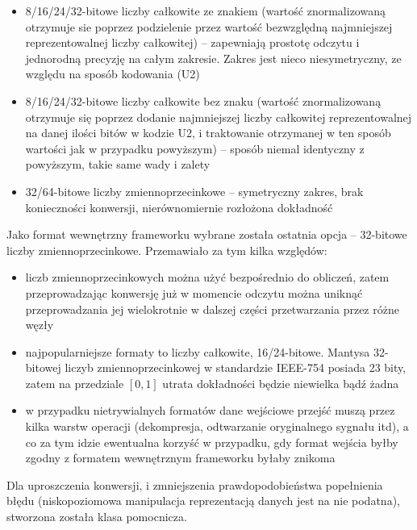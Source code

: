 \begin{itemize}
  \item 8/16/24/32-bitowe liczby całkowite ze znakiem (wartość znormalizowaną otrzymuje sie poprzez
podzielenie przez wartość bezwzględną najmniejszej reprezentowalnej liczby całkowitej) -- zapewniają
prostotę odczytu i jednorodną precyzję na całym zakresie. Zakres jest nieco niesymetryczny, ze
względu na sposób kodowania (U2)

  \item 8/16/24/32-bitowe liczby całkowite bez znaku (wartość znormalizowaną otrzymuje się poprzez
dodanie najmniejszej liczby całkowitej reprezentowalnej na danej ilości bitów w kodzie U2, i
traktowanie otrzymanej w ten sposób wartości jak w przypadku powyższym) -- sposób niemal identyczny
z powyższym, takie same wady i zalety

  \item 32/64-bitowe liczby zmiennoprzecinkowe -- symetryczny zakres, brak konieczności konwersji,
nierównomiernie rozłożona dokładność

\end{itemize}

Jako format wewnętrzny frameworku wybrane została ostatnia opcja -- 32-bitowe liczby
zmiennoprzecinkowe.  Przemawiało za tym kilka względów:

\begin{itemize}
  \item liczb zmiennoprzecinkowych można użyć bezpośrednio do obliczeń, zatem przeprowadzając
konwersję już w momencie odczytu można uniknąć przeprowadzania jej wielokrotnie w dalszej części
przetwarzania przez różne węzły

  \item najpopularniejsze formaty to liczby całkowite, 16/24-bitowe. Mantysa 32-bitowej liczyb
zmiennoprzecinkowej w standardzie IEEE-754 posiada 23 bity, zatem na przedziale $[0, 1]$ utrata
dokładności będzie niewielka bądź żadna

  \item w przypadku nietrywialnych formatów dane wejściowe przejść muszą przez kilka warstw operacji
(dekompresja, odtwarzanie oryginalnego sygnału itd), a co za tym idzie ewentualna korzyść w
przypadku, gdy format wejścia byłby zgodny z formatem wewnętrznym frameworku byłaby znikoma

\end{itemize}

Dla uproszczenia konwersji, i zmniejszenia prawdopodobieństwa popełnienia błędu (niskopoziomowa
manipulacja reprezentacją danych jest na nie podatna), stworzona została klasa pomocnicza.

